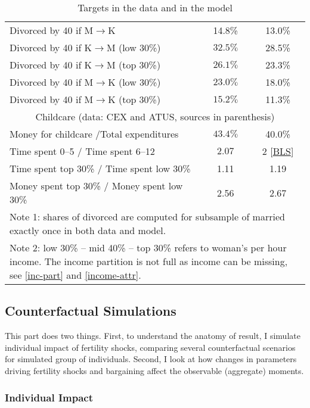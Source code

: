 \documentclass[12pt,letter]{article}
\begin{document}
\begin{table}
\begin{center}
\begin{tabular}{|l|c|c|}
Divorced by 40 if M$\to$K & 14.8\% &      13.0\% \\
Divorced by 40 if K$\to$M (low 30\%) & $32.5\%$ & 28.5\% \\
Divorced by 40 if K$\to$M (top 30\%) & $26.1\%$ & 23.3\% \\
Divorced by 40 if M$\to$K (low 30\%) & $23.0\%$ & 18.0\% \\
Divorced by 40 if M$\to$K (top 30\%) & $15.2\%$ & 11.3\% \\\hline
\multicolumn{3}{|c|}{Childcare (data: CEX and ATUS, sources in parenthesis)} \\\hline
Money for childcare /Total expenditures &$43.4\%$ & 40.0\% \cite{sommer} \\
Time spent 0--5 / Time spent 6--12 & $2.07$ & 2 [\href{https://www.bls.gov/charts/american-time-use/activity-by-parent.htm}{BLS}]\\
Time spent top 30\% / Time spent low 30\% & 1.11 & 1.19  \cite{schneider} \\
Money spent top 30\% / Money spent low 30\% & 2.56  & 2.67 \cite{schneider} \\\hline
\multicolumn{3}{|p{0.7\linewidth}|}{\footnotesize Note 1: shares of divorced are computed for subsample of married exactly once in both data and model.}\\
\multicolumn{3}{|p{0.7\linewidth}|}{\footnotesize Note 2: low 30\% -- mid 40\% -- top 30\% refers to woman's per hour income. The income partition is not full as income can be missing, see \ref{inc-part} and \ref{income-attr}.}\\\hline
\end{tabular}
\caption{Targets in the data and in the model\label{targets-main}}
\end{center}
\end{table}

\subsection{Counterfactual Simulations}

This part does two things. First, to understand the anatomy of result, I simulate individual impact of fertility shocks, comparing several counterfactual scenarios for simulated group of individuals. Second, I look at how changes in parameters driving fertility shocks and bargaining affect the observable (aggregate) moments.

\subsubsection{Individual Impact}
\end{document}
